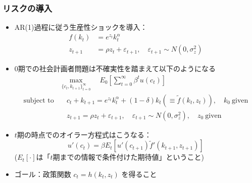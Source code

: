 \documentclass[unicode,9pt]{beamer}%
\begin{document}
\begin{frame}\frametitle{リスクの導入}
  \begin{itemize}
    \item AR(1)過程に従う生産性ショックを導入：
      \begin{align*}
        f(k_t) &= e^{z_t} k_t^{\alpha} \\
        z_{t+1} &= \rho z_t + \varepsilon_{t+1}, \quad \varepsilon_{t+1} \sim N(0, \sigma_z^2)
      \end{align*}
      \item 0期での社会計画者問題は不確実性を踏まえて以下のようになる
        \begin{align*}
          &\max_{\{c_t, k_{t+1}\}_{t=0}^{\infty}} \quad E_0 \left[ \sum_{t=0}^{\infty} \beta^t u(c_t) \right] \\
          \text{subject to} 
          &\quad c_t + k_{t+1} = e^{z_t} k_t^{\alpha} + (1 - \delta) k_t \left( \equiv \tilde{f}(k_{t}, z_t) \right), \quad k_0 \ \text{given} \\
          &\quad z_{t+1} = \rho z_t + \varepsilon_{t+1}, \quad \varepsilon_{t+1} \sim N(0, \sigma_z^2), \quad z_0 \ \text{given}
        \end{align*}
      \item $t$期の時点でのオイラー方程式はこうなる：
        $$
          u'(c_t) = \beta E_t \left[ u'(c_{t+1}) \tilde{f}'(k_{t+1}, z_{t+1}) \right]
        $$
        ($E_t[\cdot]$は「$t$期までの情報で条件付けた期待値」ということ)
      \item ゴール：政策関数 $c_t = h(k_t, z_t)$ を得ること
  \end{itemize}
\end{frame}
\end{document}
